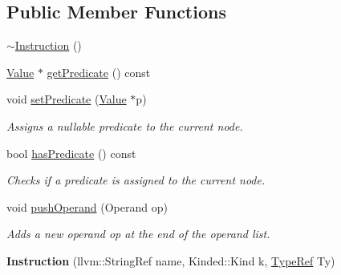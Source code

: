 \subsection*{Public Member Functions}
\begin{DoxyCompactItemize}
\item 
\hyperlink{classglow_1_1_instruction_a2e92685aa7341dd5251930b1a5860e61}{$\sim$\+Instruction} ()
\item 
\hyperlink{classglow_1_1_value}{Value} $\ast$ \hyperlink{classglow_1_1_instruction_ac66a99daf4eed52f1ad1f01a4e160c3b}{get\+Predicate} () const
\item 
\mbox{\label{classglow_1_1_instruction_ae5d84cad1a4a388821bed798feee5dc9}} 
void \hyperlink{classglow_1_1_instruction_ae5d84cad1a4a388821bed798feee5dc9}{set\+Predicate} (\hyperlink{classglow_1_1_value}{Value} $\ast$p)
\begin{DoxyCompactList}\small\item\em Assigns a nullable predicate to the current node. \end{DoxyCompactList}\item 
\mbox{\label{classglow_1_1_instruction_a28f880bf3d4d9fdd7339b90de85cc0ad}} 
bool \hyperlink{classglow_1_1_instruction_a28f880bf3d4d9fdd7339b90de85cc0ad}{has\+Predicate} () const
\begin{DoxyCompactList}\small\item\em Checks if a predicate is assigned to the current node. \end{DoxyCompactList}\item 
\mbox{\label{classglow_1_1_instruction_a33b6f1864bf51f67cd8e463c415c676e}} 
void \hyperlink{classglow_1_1_instruction_a33b6f1864bf51f67cd8e463c415c676e}{push\+Operand} (Operand op)
\begin{DoxyCompactList}\small\item\em Adds a new operand {\ttfamily op} at the end of the operand list. \end{DoxyCompactList}\item 
\mbox{\label{classglow_1_1_instruction_ae9d82794212299cf2e90282835b632f0}} 
{\bfseries Instruction} (llvm\+::\+String\+Ref name, Kinded\+::\+Kind k, \hyperlink{structglow_1_1_type}{Type\+Ref} Ty)
\item 

\end{DoxyCompactItemize}
